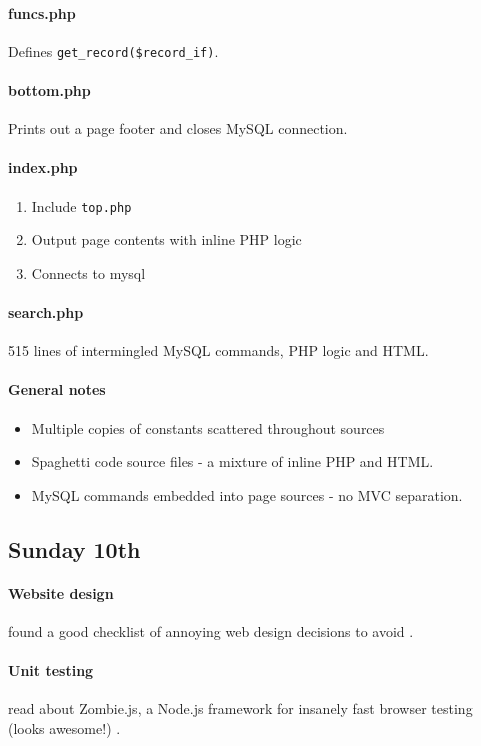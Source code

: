 \paragraph{funcs.php} Defines \texttt{get\_record(\$record\_if)}.

\paragraph{bottom.php} Prints out a page footer and closes MySQL connection.

\paragraph{index.php}
\begin{enumerate}
\item Include \texttt{top.php}
\item Output page contents with inline PHP logic
\item Connects to mysql
\end{enumerate}

\paragraph{search.php} 515 lines of intermingled MySQL commands, PHP logic and
HTML.

\paragraph{General notes}
\begin{itemize}
\item Multiple copies of constants scattered throughout sources
\item Spaghetti code source files - a mixture of inline PHP and HTML.
\item MySQL commands embedded into page sources - no MVC separation.
\end{itemize}

\subsection{Sunday 10th}
\paragraph{Website design} found a good checklist of annoying web design
decisions to avoid \cite{Saltman2013}.

\paragraph{Unit testing} read about Zombie.js, a Node.js framework for insanely
fast browser testing (looks awesome!) \cite{Loire2012}.
